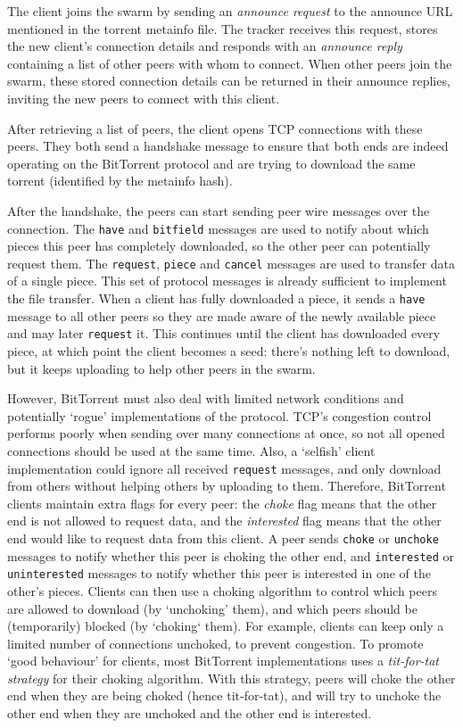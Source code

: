 The client joins the swarm by sending an \emph{announce request} to the announce URL mentioned in the torrent metainfo file. The tracker receives this request, stores the new client's connection details and responds with an \emph{announce reply} containing a list of other peers with whom to connect. When other peers join the swarm, these stored connection details can be returned in their announce replies, inviting the new peers to connect with this client.

After retrieving a list of peers, the client opens \gls{TCP} connections with these peers. They both send a handshake message to ensure that both ends are indeed operating on the BitTorrent protocol and are trying to download the same torrent (identified by the metainfo hash).

After the handshake, the peers can start sending peer wire messages over the connection. The \texttt{have} and \texttt{bitfield} messages are used to notify about which pieces this peer has completely downloaded, so the other peer can potentially request them. The \texttt{request}, \texttt{piece} and \texttt{cancel} messages are used to transfer data of a single piece. This set of protocol messages is already sufficient to implement the file transfer. When a client has fully downloaded a piece, it sends a \texttt{have} message to all other peers so they are made aware of the newly available piece and may later \texttt{request} it. This continues until the client has downloaded every piece, at which point the client becomes a seed: there's nothing left to download, but it keeps uploading to help other peers in the swarm.

However, BitTorrent must also deal with limited network conditions and potentially `rogue' implementations of the protocol. \gls{TCP}'s congestion control performs poorly when sending over many connections at once, so not all opened connections should be used at the same time. Also, a `selfish' client implementation could ignore all received \texttt{request} messages, and only download from others without helping others by uploading to them. Therefore, BitTorrent clients maintain extra flags for every peer: the \emph{choke} flag means that the other end is not allowed to request data, and the \emph{interested} flag means that the other end would like to request data from this client. A peer sends \texttt{choke} or \texttt{unchoke} messages to notify whether this peer is choking the other end, and \texttt{interested} or \texttt{uninterested} messages to notify whether this peer is interested in one of the other's pieces. Clients can then use a choking algorithm to control which peers are allowed to download (by `unchoking' them), and which peers should be (temporarily) blocked (by `choking` them). For example, clients can keep only a limited number of connections unchoked, to prevent congestion. To promote `good behaviour' for clients, most BitTorrent implementations uses a \emph{tit-for-tat strategy} for their choking algorithm. With this strategy, peers will choke the other end when they are being choked (hence tit-for-tat), and will try to unchoke the other end when they are unchoked and the other end is interested.

